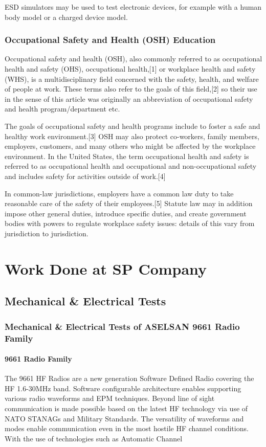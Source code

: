 	ESD simulators may be used to test electronic devices, for example with a human body model or a charged device model.

\subsubsection{Occupational Safety and Health (OSH) Education}
\- \indent
	Occupational safety and health (OSH), also commonly referred to as occupational health and safety (OHS), occupational health,[1] or workplace health and safety (WHS), is a multidisciplinary field concerned with the safety, health, and welfare of people at work. These terms also refer to the goals of this field,[2] so their use in the sense of this article was originally an abbreviation of occupational safety and health program/department etc.

	The goals of occupational safety and health programs include to foster a safe and healthy work environment.[3] OSH may also protect co-workers, family members, employers, customers, and many others who might be affected by the workplace environment. In the United States, the term occupational health and safety is referred to as occupational health and occupational and non-occupational safety and includes safety for activities outside of work.[4]

	In common-law jurisdictions, employers have a common law duty to take reasonable care of the safety of their employees.[5] Statute law may in addition impose other general duties, introduce specific duties, and create government bodies with powers to regulate workplace safety issues: details of this vary from jurisdiction to jurisdiction.


\section{Work Done at SP Company}

\subsection{Mechanical \& Electrical Tests   }


\subsubsection{Mechanical \& Electrical Tests of ASELSAN 9661 Radio Family  }

\paragraph{9661 Radio Family}
\- \indent	
	The 9661 HF Radios are a new generation Software Defined Radio covering the HF 1.6-30MHz band. Software configurable architecture enables supporting various radio waveforms and EPM techniques. Beyond line of sight communication is made possible based on the latest HF technology via use of NATO STANAGs and Military Standards. The versatility of waveforms and modes enable communication even in the most hostile HF channel conditions. With the use of technologies such as Automatic Channel

